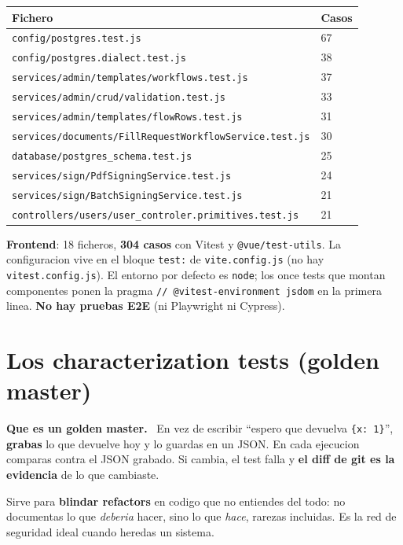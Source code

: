 \documentclass[11pt,a4paper,oneside]{report}
\newenvironment{concepto}[1][Concepto para juniors]{%
  \par\medskip
  \colorlet{shadecolor}{blue!7}%
  \begin{shaded}\noindent\textbf{\color{blue!55!black}#1.}\ \ignorespaces}%
  {\end{shaded}\par\medskip}
\newcommand{\rt}[1]{\texttt{#1}}
\begin{document}
\begin{center}
\footnotesize
\begin{tabularx}{\textwidth}{@{}LP{1.6cm}@{}}
\toprule
\textbf{Fichero} & \textbf{Casos} \\
\midrule
\rt{config/postgres.test.js}                                & 67 \\
\rt{config/postgres.dialect.test.js}                        & 38 \\
\rt{services/admin/templates/workflows.test.js}             & 37 \\
\rt{services/admin/crud/validation.test.js}                 & 33 \\
\rt{services/admin/templates/flowRows.test.js}              & 31 \\
\rt{services/documents/FillRequestWorkflowService.test.js}  & 30 \\
\rt{database/postgres\_schema.test.js}                      & 25 \\
\rt{services/sign/PdfSigningService.test.js}                & 24 \\
\rt{services/sign/BatchSigningService.test.js}              & 21 \\
\rt{controllers/users/user\_controler.primitives.test.js}   & 21 \\
\bottomrule
\end{tabularx}
\end{center}

\textbf{Frontend}: 18 ficheros, \textbf{304 casos} con Vitest y \rt{@vue/test-utils}. La
configuracion vive en el bloque \rt{test:} de \rt{vite.config.js} (no hay \rt{vitest.config.js}).
El entorno por defecto es \rt{node}; los once tests que montan componentes ponen la pragma
\rt{// @vitest-environment jsdom} en la primera linea. \textbf{No hay pruebas E2E} (ni Playwright
ni Cypress).

\section{Los characterization tests (golden master)}

\begin{concepto}[Que es un golden master]
En vez de escribir ``espero que devuelva \rt{\{x: 1\}}'', \textbf{grabas} lo que devuelve hoy y
lo guardas en un JSON. En cada ejecucion comparas contra el JSON grabado. Si cambia, el test
falla y \textbf{el diff de git es la evidencia} de lo que cambiaste.

Sirve para \textbf{blindar refactors} en codigo que no entiendes del todo: no documentas lo que
\emph{deberia} hacer, sino lo que \emph{hace}, rarezas incluidas. Es la red de seguridad ideal
cuando heredas un sistema.
\end{concepto}
\end{document}
